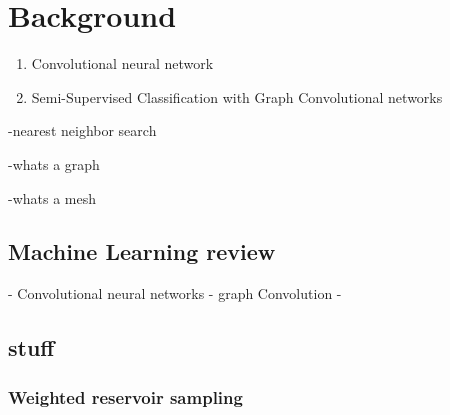 \chapter{Background}
\label{sec:background}

\begin{enumerate}
    \item Convolutional neural network
    \item Semi-Supervised Classification with Graph Convolutional networks
\end{enumerate}
-nearest neighbor search

-whats a graph

-whats a mesh
\section{Machine Learning review}
- Convolutional neural networks
- graph Convolution
- 

\label{back:ptt}
\label{ml_review}

\section{stuff}
\subsection{Weighted reservoir sampling}
\label{subsec:wrs}


